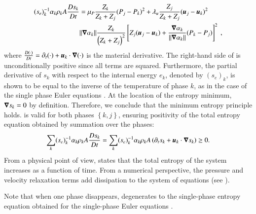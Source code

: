 \documentclass[preprint,10pt]{elsarticle}
\begin{document}
%
\begin{align} \label{eq:ent-eqn-7-eqn-model}
(s_{e})_k^{-1} \alpha_k \rho_k A \frac{Ds_k}{Dt} &= \mu_P \frac{Z_k}{Z_k+Z_j} (P_j - P_k)^2 + \lambda_u \frac{Z_j}{Z_k+Z_j} (\boldsymbol u_j -\boldsymbol u_k)^2 \nonumber
\\
& \| \boldsymbol\nabla \alpha_k \| \frac{Z_k}{\left( Z_k+Z_j \right)^2} \left[ Z_j (\boldsymbol u_j-\boldsymbol u_k)+\frac{\boldsymbol\nabla \alpha_k}{\| \boldsymbol\nabla \alpha_k \|}(P_k-P_j)\right]^2 \ ,
\end{align}
%
where $\frac{D(\cdot) }{Dt} = \partial_t (\cdot) + \boldsymbol u_k \cdot \boldsymbol\nabla (\cdot)$ is the material derivative.
The right-hand side of  is unconditionally positive since all terms are squared. Furthermore, 
the partial derivative of $s_k$ with respect to the internal energy $e_k$, denoted by $(s_e)_k$, is shown to be equal to the inverse of the temperature of phase $k$, as in the case of the single phase Euler equations \cite{jlg, Marco_dissertation}. At the location of the entropy minimum, $\boldsymbol\nabla s_k =0$ by definition. Therefore, we conclude  that the minimum entropy principle holds.
%
%
 is valid for both phases $\left\{k, j\right\}$, ensuring positivity of the total entropy equation obtained by summation over the phases:
%
\begin{equation}\label{eq:tot-ent-res-sct4}
\sum_k (s_{e})_k^{-1} \alpha_k \rho_k A \frac{Ds_k}{Dt} = \sum_k (s_{e})_k^{-1} \alpha_k \rho_k A \left( \partial_t s_k + \boldsymbol u_k \cdot \boldsymbol\nabla s_k \right) \geq 0  .
\end{equation}
%
From a physical point of view,  states that the total entropy of the system increases as a function of time. From a numerical perspective, the pressure and velocity relaxation terms add dissipation to the system of equations (see ).

Note that when one phase disappears,  degenerates to the single-phase entropy equation obtained for the single-phase Euler equations \cite{SEM, Marco_dissertation}.

\end{document}

